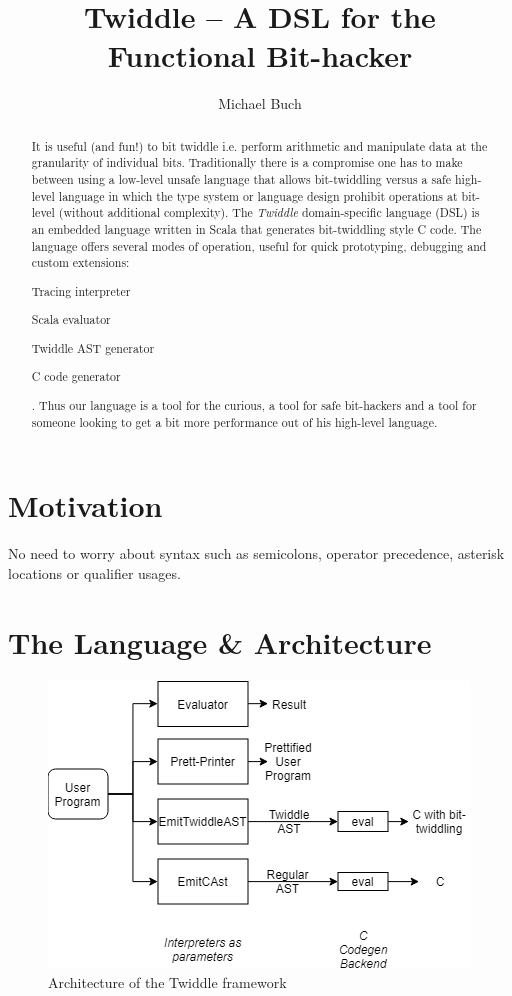 \documentclass{article}
\title{Twiddle -- A DSL for the Functional Bit-hacker}
\author{Michael Buch}
\begin{document}
\maketitle
\frenchspacing

\begin{abstract}
It is useful (and fun!) to bit twiddle i.e. perform arithmetic and manipulate data at the granularity of individual bits. Traditionally there is a compromise one has to make between using a low-level unsafe language that allows bit-twiddling versus a safe high-level language in which the type system or language design prohibit operations at bit-level (without additional complexity). The \textit{Twiddle} domain-specific language (DSL) is an embedded language written in Scala that generates bit-twiddling style C code. The language offers several modes of operation, useful for quick prototyping, debugging and custom extensions:
\begin{enumerate*}[label=(\arabic*)]
	\item Tracing interpreter
	\item Scala evaluator
	\item Twiddle AST generator
	\item C code generator
\end{enumerate*}.
Thus our language is a tool for the curious, a tool for safe bit-hackers and a tool for someone looking to get a bit more performance out of his high-level language.
\end{abstract}

\section{Motivation}
No need to worry about syntax such as semicolons, operator precedence, asterisk locations or qualifier usages.
\section{The Language \& Architecture}
\begin{figure}[t]
	\centering
	\includegraphics[scale=1]{twiddle_arch.png}
	\caption{Architecture of the Twiddle framework}\label{twiddle_arch}
\end{figure}
\end{document}
